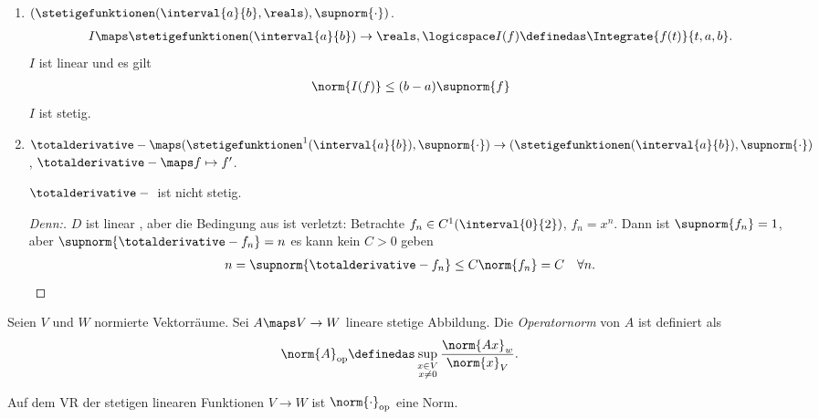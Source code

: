 \begin{beispiele*}
    \begin{enumerate}
        \item \( (\stetigefunktionen(\interval{a}{b},\reals),\supnorm{\cdot}) \).
        \begin{align*}
            I\maps \stetigefunktionen(\interval{a}{b})\to \reals,\logicspace I(f)\definedas \Integrate{f(t)}{t,a,b}.
        \end{align*}
        \( I \) ist linear und es gilt
        \begin{align*}
            \norm{I(f)}\leq (b-a)\supnorm{f}
        \end{align*}
        \timplies \( I \) ist stetig.
        \item \( \totalderivative-{}\maps (\stetigefunktionen^1(\interval{a}{b}),\supnorm{\cdot})\to (\stetigefunktionen(\interval{a}{b}),\supnorm{\cdot}) \), \( \totalderivative-{}\maps f\mapsto f' \).
        \begin{behauptung*}
            \( \totalderivative-{} \) ist nicht stetig.
        \end{behauptung*}
        \begin{proof}[Denn:]
            \( D \) ist linear \checkmark, aber die Bedingung aus  ist verletzt: Betrachte \( f_n\in C^1(\interval{0}{2}) \), \( f_n=x^n    \).
            Dann ist \( \supnorm{f_n}=1 \), aber \( \supnorm{\totalderivative-{f_n}}=n \) \timplies es kann kein \( C>0 \) geben \sd
            \begin{align*}
                n=\supnorm{\totalderivative-{f_n}}\leq C\norm{f_n}=C\quad \forall n.
            \end{align*}
        \end{proof}
    \end{enumerate}
\end{beispiele*}
\begin{definition*}
    Seien \( V \) und \( W \) normierte Vektorräume.
    Sei \( A\maps V\to W \) lineare stetige Abbildung.
    Die \emph{Operatornorm} von \( A \) ist definiert als
    \begin{align*}
        \norm{A}_{\text{op}}\definedas \sup_{\substack{x\in V\\ x\neq 0}}\frac{\norm{Ax}_{w}}{\norm{x}_{V}}.
    \end{align*}
\end{definition*}
    Auf dem VR der stetigen linearen Funktionen \( V\to W \) ist \( \norm{\cdot}_{\text{op}} \) eine Norm.
